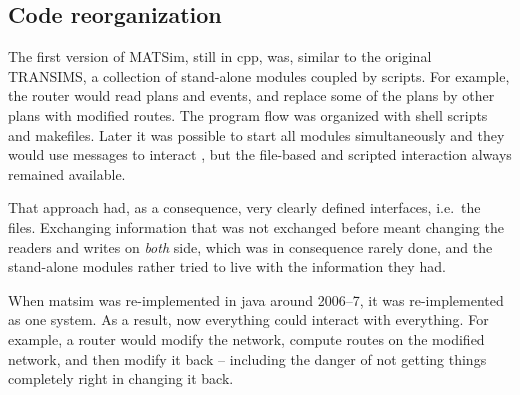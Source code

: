 

%



\subsection{Code reorganization}
\label{sec:matsim-core-reorg}

The first version of MATSim, still in \gls{cpp}, was, similar to the original TRANSIMS, a collection of stand-alone modules coupled by scripts.  For example, the router would read plans and events, and replace some of the plans by other plans with modified routes.  The program flow was organized with shell scripts and makefiles.  Later it was possible to start all modules simultaneously and they would use messages to interact \citep[also see][]{GloorNagel2005ped-att04-birkh}, but the file-based and scripted interaction always remained available.

That approach had, as a consequence, very clearly defined interfaces, i.e.\ the files.  Exchanging information that was not exchanged before meant changing the readers and writes on \emph{both} side, which was in consequence rarely done, and the stand-alone modules rather tried to live with the information they had.

When \acrshort{matsim} was re-implemented in \gls{java} around 2006--7, it was re-implemented as one system.  As a result, now everything could interact with everything.  For example, a router would modify the network, compute routes on the modified network, and then modify it back -- including the danger of not getting things completely right in changing it back.  

